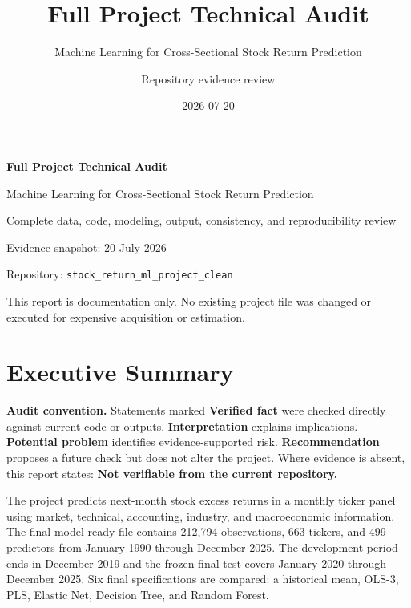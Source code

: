 \documentclass[
  11pt,
  a4paper]{article}
\title{Full Project Technical Audit}
\subtitle{Machine Learning for Cross-Sectional Stock Return Prediction}
\author{Repository evidence review}
\date{2026-07-20}
\begin{document}
\begin{titlepage}
\thispagestyle{empty}
\centering
\vspace*{2.2cm}
{\Huge\bfseries Full Project Technical Audit\par}
\vspace{0.6cm}
{\Large Machine Learning for Cross-Sectional Stock Return Prediction\par}
\vspace{1.5cm}
{\large Complete data, code, modeling, output, consistency, and reproducibility review\par}
\vfill
{\large Evidence snapshot: 20 July 2026\par}
\vspace{0.4cm}
{\normalsize Repository: \texttt{stock\_\allowbreak{}return\_\allowbreak{}ml\_\allowbreak{}project\_\allowbreak{}clean}\par}
\vspace{1.0cm}
{\small This report is documentation only. No existing project file was changed or executed for expensive acquisition or estimation.\par}
\end{titlepage}

\tableofcontents
\clearpage
{}

\section{Executive Summary}\label{sec-executive}

\textbf{Audit convention.} Statements marked \textbf{Verified fact} were
checked directly against current code or outputs.
\textbf{Interpretation} explains implications. \textbf{Potential
problem} identifies evidence-supported risk. \textbf{Recommendation}
proposes a future check but does not alter the project. Where evidence
is absent, this report states: \textbf{Not verifiable from the current
repository.}

The project predicts next-month stock excess returns in a monthly ticker
panel using market, technical, accounting, industry, and macroeconomic
information. The final model-ready file contains 212,794 observations,
663 tickers, and 499 predictors from January 1990 through December 2025.
The development period ends in December 2019 and the frozen final test
covers January 2020 through December 2025. Six final specifications are
compared: a historical mean, OLS-3, PLS, Elastic Net, Decision Tree, and
Random Forest.
\end{document}
